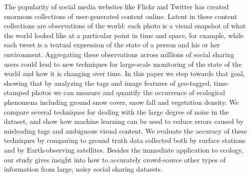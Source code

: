 The popularity of social media websites like Flickr
and Twitter has created enormous collections of user-generated content
online. Latent in these content collections are observations of the
world: each photo is a visual snapshot of what the world looked like
at a particular point in time and space, for example, while each tweet
is a textual expression of the state of a person and his or her
environment. Aggregating these observations across millions
of social sharing users could lead to new techniques for large-scale
monitoring of the state of the world and how it is changing over
time. In this paper we step towards that goal, showing that by
analyzing the tags and image features of geo-tagged, time-stamped
photos we can measure and quantify the occurrence of ecological
phenomena including ground snow cover, snow fall and vegetation
density.  We compare several techniques for dealing with the large
degree of noise in the dataset, and show how machine learning can be
used to reduce errors caused by misleading tags and ambiguous visual
content. We evaluate the accuracy of these techniques by comparing to
ground truth data collected both by surface stations and by
Earth-observing satellites. Besides the immediate application to
ecology, our study gives insight into how to accurately crowd-source                                                                                                                           
other types of information from large, noisy social sharing datasets.


